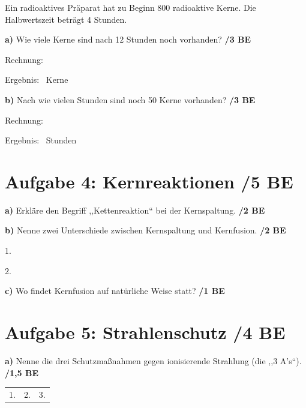 \documentclass[11pt,a4paper]{article}
\newcommand{\punkte}[1]{\hfill\textbf{/#1 BE}}
\newcommand{\antwortzeile}{\vspace{0.5cm}\hrulefill\par}
\newcommand{\antwortfeld}[1]{\vspace{#1}\hrulefill\par\vspace{0.2cm}\hrulefill\par\vspace{0.2cm}\hrulefill\par}
\begin{document}
Ein radioaktives Präparat hat zu Beginn 800 radioaktive Kerne. Die Halbwertszeit beträgt 4 Stunden.

\vspace{0.3cm}

\textbf{a)} Wie viele Kerne sind nach 12 Stunden noch vorhanden? \punkte{3}

Rechnung:
\antwortfeld{1.5cm}

Ergebnis: \hrulefill\ Kerne

\vspace{0.5cm}

\textbf{b)} Nach wie vielen Stunden sind noch 50 Kerne vorhanden? \punkte{3}

Rechnung:
\antwortfeld{1.5cm}

Ergebnis: \hrulefill\ Stunden

\vspace{0.5cm}

\section*{Aufgabe 4: Kernreaktionen \punkte{5}}

\textbf{a)} Erkläre den Begriff ,,Kettenreaktion`` bei der Kernspaltung. \punkte{2}

\antwortfeld{1cm}

\vspace{0.3cm}

\textbf{b)} Nenne zwei Unterschiede zwischen Kernspaltung und Kernfusion. \punkte{2}

1. \hrulefill

\vspace{0.3cm}

2. \hrulefill

\vspace{0.5cm}

\textbf{c)} Wo findet Kernfusion auf natürliche Weise statt? \punkte{1}

\antwortzeile

\vspace{0.5cm}

\section*{Aufgabe 5: Strahlenschutz \punkte{4}}

\textbf{a)} Nenne die drei Schutzmaßnahmen gegen ionisierende Strahlung (die ,,3 A's``). \punkte{1,5}

\begin{tabular}{@{}p{4cm}p{4cm}p{4cm}@{}}
1. \hrulefill & 2. \hrulefill & 3. \hrulefill \\
\end{tabular}
\end{document}
